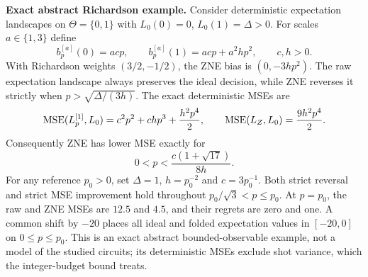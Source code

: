 \noindent\textbf{Exact abstract Richardson example.}
Consider deterministic expectation landscapes on $\Theta=\{0,1\}$ with
$L_0(0)=0$, $L_0(1)=\Delta>0$. For scales $a\in\{1,3\}$ define
\[
 b_p^{[a]}(0)=acp,\qquad b_p^{[a]}(1)=acp+a^2hp^2,
 \qquad c,h>0.
\]
With Richardson weights $(3/2,-1/2)$, the ZNE bias is $(0,-3hp^2)$.
The raw expectation landscape always preserves the ideal decision, while ZNE
reverses it strictly when $p>\sqrt{\Delta/(3h)}$. The exact deterministic MSEs are
\[
 \operatorname{MSE}(L_p^{[1]},L_0)=c^2p^2+chp^3+\frac{h^2p^4}{2},\qquad
 \operatorname{MSE}(L_Z,L_0)=\frac{9h^2p^4}{2}.
\]
Consequently ZNE has lower MSE exactly for
\[
 0<p<\frac{c(1+\sqrt{17})}{8h}.
\]
For any reference $p_0>0$, set $\Delta=1$, $h=p_0^{-2}$ and $c=3p_0^{-1}$.
Both strict reversal and strict MSE improvement hold throughout
$p_0/\sqrt3<p\leq p_0$. At $p=p_0$, the raw and ZNE MSEs are $12.5$ and $4.5$,
and their regrets are zero and one. A common shift by $-20$ places all ideal and
folded expectation values in $[-20,0]$ on $0\leq p\leq p_0$.
This is an exact abstract bounded-observable example, not a model of the studied
circuits; its deterministic MSEs exclude shot variance, which the integer-budget
bound treats.
